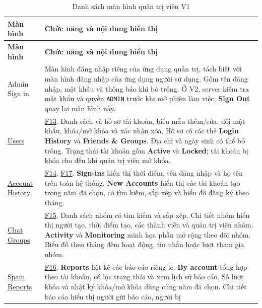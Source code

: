 \begingroup
\small
\begin{longtable}{|L{4.3cm}|L{\dimexpr\textwidth-4.3cm-4\arrayrulewidth\relax}|}
  \caption{Danh sách màn hình quản trị viên V1}
  \label{tab:admin-screen-map}\\
  \hline
  \textbf{Màn hình} & \textbf{Chức năng và nội dung hiển thị}\\
  \hline
  \endfirsthead
  \hline
  \textbf{Màn hình} & \textbf{Chức năng và nội dung hiển thị}\\
  \hline
  \endhead
  Admin Sign in
  & Màn hình đăng nhập riêng của ứng dụng quản trị, tách biệt với màn hình
  đăng nhập của ứng dụng người sử dụng. Gồm tên đăng nhập, mật khẩu và thông báo
  khi bỏ trống. Ở V2, server kiểm tra mật khẩu và quyền \texttt{ADMIN}
  trước khi mở phiên làm việc; \textbf{Sign Out} quay lại màn hình này.\\
  \hline
  \href{https://www.figma.com/design/maCogjZs9eOOhfkxsOZoIU?node-id=2-80}{Users}
  & \hyperlink{F13}{F13}. Danh sách và hồ sơ tài khoản, biểu mẫu thêm/sửa,
  đổi mật khẩu, khóa/mở khóa và xác nhận xóa. Hồ sơ có các thẻ
  \textbf{Login History} và \textbf{Friends \& Groups}. Địa chỉ và ngày sinh
  có thể bỏ trống. Trạng thái tài khoản gồm \textbf{Active} và \textbf{Locked};
  tài khoản bị khóa cho đến khi quản trị viên mở khóa.\\
  \hline
  \href{https://www.figma.com/design/maCogjZs9eOOhfkxsOZoIU?node-id=16-822}{Account History}
  & \hyperlink{F14}{F14}, \hyperlink{F17}{F17}. \textbf{Sign-ins} hiển thị
  thời điểm, tên đăng nhập và họ tên trên toàn hệ thống. \textbf{New Accounts}
  hiển thị các tài khoản tạo trong năm đã chọn, có tìm kiếm, sắp xếp và biểu đồ đăng ký theo tháng.\\
  \hline
  \href{https://www.figma.com/design/maCogjZs9eOOhfkxsOZoIU?node-id=25-1020}{Chat Groups}
  & \hyperlink{F15}{F15}. Danh sách nhóm có tìm kiếm và sắp xếp. Chi tiết nhóm
  hiển thị người tạo, thời điểm tạo, các thành viên và quản trị viên nhóm.
  \textbf{Activity} và \textbf{Monitoring} minh họa phần mở rộng theo dõi nhóm. Biểu đồ theo tháng đếm hoạt động, tin nhắn hoặc lượt tham gia nhóm.\\
  \hline
  \href{https://www.figma.com/design/maCogjZs9eOOhfkxsOZoIU?node-id=38-1461}{Spam Reports}
  & \hyperlink{F16}{F16}. \textbf{Reports} liệt kê các báo cáo riêng lẻ.
  \textbf{By account} tổng hợp theo tài khoản, có lọc trạng thái và xem
  lịch sử báo cáo. Số lượt khóa và nhật ký khóa/mở khóa dùng cùng năm đã chọn.
  Chi tiết báo cáo hiển thị người gửi báo cáo, người bị

\end{longtable}
